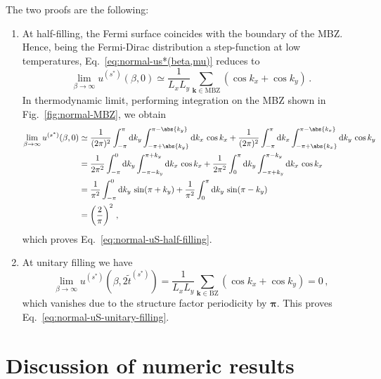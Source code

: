 \begin{tabproof}

	The two proofs are the following:
	\begin{enumerate}
		\item At half-filling, the Fermi surface coincides with the boundary of the MBZ. Hence, being the Fermi-Dirac distribution a step-function at low temperatures, Eq.~\eqref{eq:normal-us*(beta,mu)} reduces to
		\[
			\lim_{\beta \to \infty} u^{(s^*)}(\beta,0) \simeq \frac{1}{L_x L_y} \sum_{\mathbf{k}\in\mathrm{MBZ}} (\cos k_x + \cos k_y) \, .
		\]
		In thermodynamic limit, performing integration on the MBZ shown in Fig.~\ref{fig:normal-MBZ}, we obtain
		\[
		\begin{aligned}
			\lim_{\beta \to \infty} u^{(s^*)}(\beta,0) &\simeq \frac{1}{(2\pi)^2} \int_{-\pi}^{\pi} \mathrm{d} k_y \int_{-\pi+\abs{k_y}}^{\pi-\abs{k_y}} \mathrm{d} k_x\, \cos k_x + \frac{1}{(2\pi)^2} \int_{-\pi}^{\pi} \mathrm{d} k_x \int_{-\pi+\abs{k_x}}^{\pi-\abs{k_x}} \mathrm{d} k_y\, \cos k_y \\
			&= \frac{1}{2\pi^2} \int_{-\pi}^{0} \mathrm{d} k_y \int_{-\pi-k_y}^{\pi+k_y} \mathrm{d} k_x\, \cos k_x + \frac{1}{2\pi^2} \int_{0}^{\pi} \mathrm{d} k_y \int_{-\pi+k_y}^{\pi-k_y} \mathrm{d} k_x\, \cos k_x \\
			&= \frac{1}{\pi^2} \int_{-\pi}^{0} \mathrm{d} k_y\, \sin (\pi+k_y) + \frac{1}{\pi^2} \int_{0}^{\pi} \mathrm{d} k_y\, \sin (\pi-k_y) \\ 
			&= \left( \frac{2}{\pi} \right)^2 \, ,
		\end{aligned}
		\]
		which proves Eq.~\eqref{eq:normal-uS-half-filling}.
		\item At unitary filling we have
		\[
			\lim_{\beta \to \infty} u^{(s^*)}\left(
				\beta,2\tilde{t}^{(s^*)}
			\right) = \frac{1}{L_x L_y} \sum_{\mathbf{k}\in\mathrm{BZ}} (\cos k_x + \cos k_y) = 0 \, ,
		\]
		which vanishes due to the structure factor periodicity by $\bm{\pi}$. This proves Eq.~\eqref{eq:normal-uS-unitary-filling}.
	\end{enumerate}
\end{tabproof}

\section{Discussion of numeric results}\label{sec:normal-numeric}

